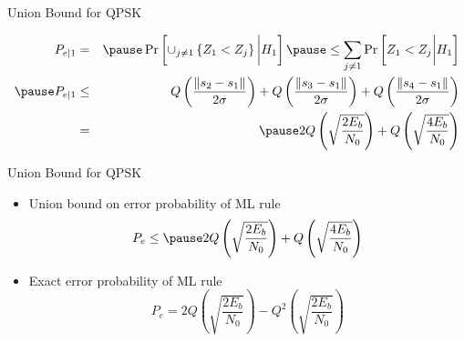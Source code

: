 \documentclass[t]{beamer}
\begin{document}
\begin{frame}{Union Bound for QPSK}
  \footnotesize
  \begin{figure}
    \centering
  \end{figure}
  \begin{eqnarray*}
    P_{e|1} & = & \pause \Pr\left[\cup_{j \neq 1} \left\{ Z_1 < Z_j \right\} \bigg| H_1 \right] \pause \leq \sum_{j \neq 1} \Pr\left[Z_1 < Z_j \bigg| H_1 \right] \\ \pause
    P_{e|1} & \leq & Q\left( \frac{\lVert s_2 - s_1\rVert}{2\sigma}\right) + Q\left( \frac{\lVert s_3 - s_1\rVert}{2\sigma}\right) + Q\left( \frac{\lVert s_4 - s_1\rVert}{2\sigma}\right) \\
            & = & \pause 2Q\left(\sqrt{\frac{2E_b}{N_0} }\right) +Q\left(\sqrt{\frac{4E_b}{N_0} }\right) 
  \end{eqnarray*}
  \normalsize
\end{frame}

\begin{frame}{Union Bound for QPSK}
  \footnotesize
  \begin{itemize}
    \item Union bound on error probability of ML rule
      \begin{equation*}
        P_e  \leq  \pause 2Q\left(\sqrt{\frac{2E_b}{N_0} }\right) +Q\left(\sqrt{\frac{4E_b}{N_0} }\right) 
      \end{equation*}
    \item \pause Exact error probability of ML rule
      \begin{equation*}
        P_{e} = 2Q\left(\sqrt{\frac{2E_b}{N_0} }\right) -Q^2\left(\sqrt{\frac{2E_b}{N_0} }\right) 
      \end{equation*}
  \end{itemize}
  \normalsize
\end{frame}
\end{document}
